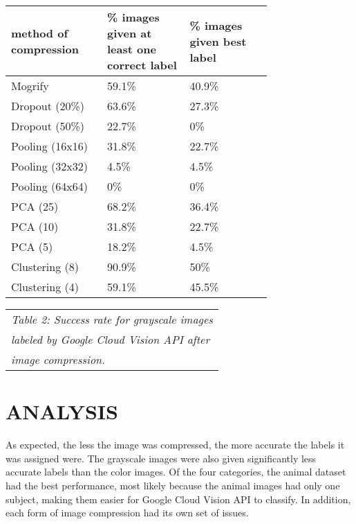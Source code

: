 \documentclass[letterpaper, 12 pt, conference]{ieeeconf}  %
\begin{document}
\bgroup
\def\arraystretch{1.2} %
\begin{tabular}{|p{0.25\linewidth}|p{0.25\linewidth}|p{0.25\linewidth}|}
\hline
{\bf method of compression} & {\bf \% images given at least one correct label}
	& {\bf \% images given best label} \\
\hline
Mogrify & 59.1\% & 40.9\% \\ %
\hline
Dropout (20\%) & 63.6\% & 27.3\% \\ %
\hline
Dropout (50\%) & 22.7\% & 0\% \\ %
\hline
Pooling (16x16) & 31.8\% & 22.7\% \\ %
\hline
Pooling (32x32) & 4.5\% & 4.5\%\\ %
\hline
Pooling (64x64) & 0\% & 0\% \\ %
\hline
PCA (25) & 68.2\% & 36.4\% \\ %
\hline
PCA (10) & 31.8\% & 22.7\% \\ %
\hline
PCA (5) & 18.2\% & 4.5\% \\ %
\hline
Clustering (8) & 90.9\% & 50\% \\ %
\hline
Clustering (4) & 59.1\% & 45.5\% \\ %
\hline
\end{tabular}
\egroup

\vspace*{2mm}
\begin{tabular}{l}
{\it Table 2: Success rate for grayscale images} \\
{\it labeled by Google Cloud Vision API after} \\
{\it image compression.} \\
\end{tabular}

\def\arraystretch{1.0} %

\vspace*{4mm}

\section{ANALYSIS}

As expected, the less the image was compressed, the more accurate
the labels it was assigned were. The grayscale images were also
given significantly less accurate labels than the color images.
Of the four categories, the animal dataset had the best
performance, most likely because the animal images had only
one subject, making them easier for Google Cloud Vision API to classify.
In addition, each form of image
compression had its own set of issues.
\end{document}
